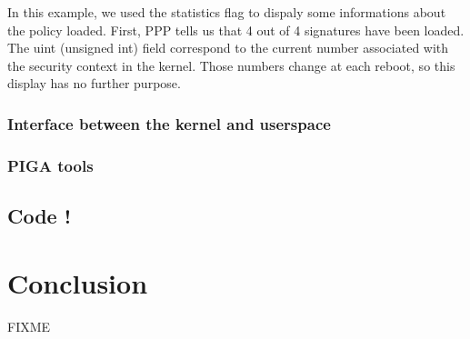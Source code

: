 \documentclass[pdftex,a4paper,titlepage,11pt]{article}
\begin{document}
In this example, we used the statistics flag to dispaly some informations about the policy loaded. First, PPP tells us that 4 out of 4 signatures have been loaded. The uint (unsigned int) field correspond to the current number associated with the security context in the kernel. Those numbers change at each reboot, so this display has no further purpose.



\subsubsection{Interface between the kernel and userspace}


\subsubsection{PIGA tools}


\subsection{Code !}

\newpage

\section*{Conclusion} 

FIXME
%
%
%
%
%
%
\end{document}
